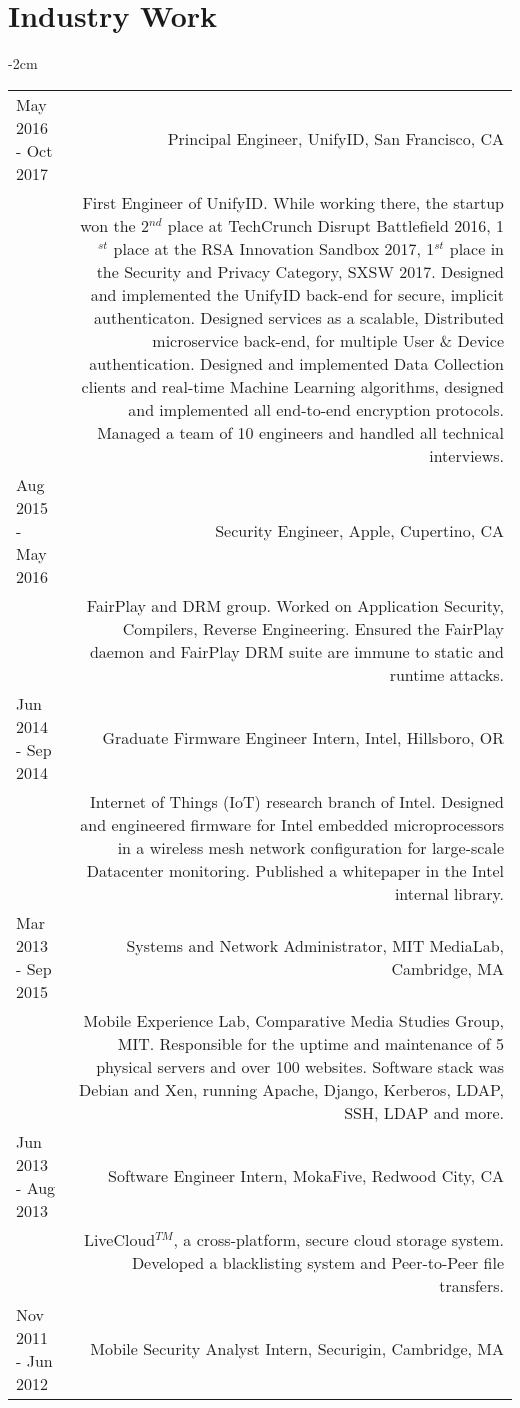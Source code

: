 \documentclass[lettersize,10pt]{article}
\begin{document}
\section{Industry Work}
\begin{adjustwidth}{}{-2cm}
  \begin{tabularx}{\textwidth}{L R}
	May 2016 - Oct 2017 & {\sc Principal Engineer, UnifyID}, San Francisco, CA\\
	& First Engineer of UnifyID. While working there, the startup won the 2$^{nd}$ place at TechCrunch Disrupt Battlefield 2016,
	  1$^{st}$ place at the RSA Innovation Sandbox 2017, 1$^{st}$ place in the Security and Privacy Category, SXSW 2017. Designed and
      implemented the UnifyID back-end for secure, implicit authenticaton. Designed services as a scalable,
      Distributed microservice back-end, for multiple User \& Device authentication. Designed and implemented Data Collection clients and
      real-time Machine Learning algorithms, designed and implemented all end-to-end encryption protocols. Managed a team of 10 engineers and
      handled all technical interviews. \\

	Aug 2015 - May 2016 & {\sc Security Engineer, Apple}, Cupertino, CA \\
	& FairPlay and DRM group. Worked on Application Security, Compilers, Reverse Engineering.
	Ensured the FairPlay daemon and FairPlay DRM suite are immune to static and runtime attacks. \\

	Jun 2014 - Sep 2014 & {\sc Graduate Firmware Engineer Intern, Intel}, Hillsboro, OR \\
	& Internet of Things (IoT) research branch of Intel. Designed and engineered firmware for Intel embedded microprocessors
	  in a wireless mesh network configuration for large-scale Datacenter monitoring. Published a whitepaper in the Intel internal library. \\

    Mar 2013 - Sep 2015 & {\sc Systems and Network Administrator}, MIT MediaLab, Cambridge, MA \\
	& Mobile Experience Lab, Comparative Media Studies Group, MIT. Responsible for the uptime and maintenance of 5 physical servers and over 100 websites.
	  Software stack was Debian and Xen, running Apache, Django, Kerberos, LDAP, SSH, LDAP and more. \\

	Jun 2013 - Aug 2013 & {\sc Software Engineer Intern, MokaFive}, Redwood City, CA \\
	& LiveCloud$^{TM}$, a cross-platform, secure cloud storage system. Developed a blacklisting system and Peer-to-Peer file transfers. \\
	Nov 2011 - Jun 2012 & {\sc Mobile Security Analyst Intern, Securigin}, Cambridge, MA \\


\end{tabularx}
\end{adjustwidth}
\end{document}
